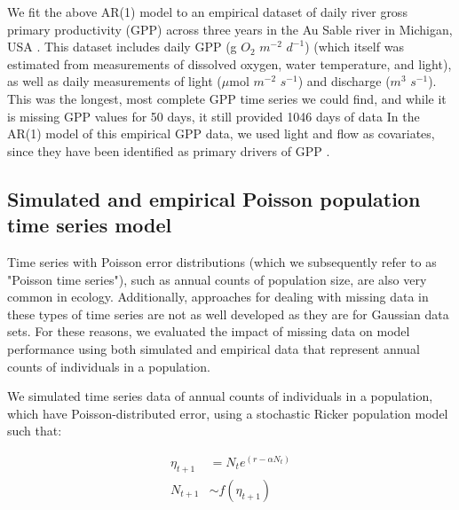 \documentclass{article}
\begin{document}

We fit the above AR(1) model to an empirical dataset of daily river gross primary productivity (GPP) across three years in the Au Sable river in Michigan, USA  \citep{hall_turbidity_2015}. This dataset includes daily GPP (g \(O_2\) \(m^{-2}\) \(d^{-1}\)) (which itself was estimated from measurements of dissolved oxygen, water temperature, and light), as  well as daily measurements of light (\(\mu\)mol \(m^{-2}\) \(s^{-1}\)) and discharge (\(m^{3}\) \(s^{-1}\)). This was the longest, most complete GPP time series we could find, and while it is missing GPP values for 50 days, it still provided 1046 days of data %
In the AR(1) model of this empirical GPP data, we used light and flow as covariates, since they have been identified as primary drivers of GPP \citep{bernhardt_metabolic_2018}. 

\subsection*{Simulated and empirical Poisson population time series model}

Time series with Poisson error distributions (which we subsequently refer to as "Poisson time series"), such as annual counts of population size, are also very common in ecology. Additionally, approaches for dealing with missing data in these types of time series are not as well developed as they are for Gaussian data sets. For these reasons, we evaluated the impact of missing data on model performance using both simulated and empirical data that represent annual counts of individuals in a population. 

We simulated time series data of annual counts of individuals in a population, which have Poisson-distributed error, using a stochastic Ricker population model \citep{ricker1954stock} such that:


\begin{subequations}
\begin{align} \label{eq:ricker2}
    \eta_{t+1} &= N_t e^{(r - \alpha N_t)}\\
    N_{t+1} &\sim f(\eta_{t+1})
\end{align}
\end{subequations}
\end{document}
